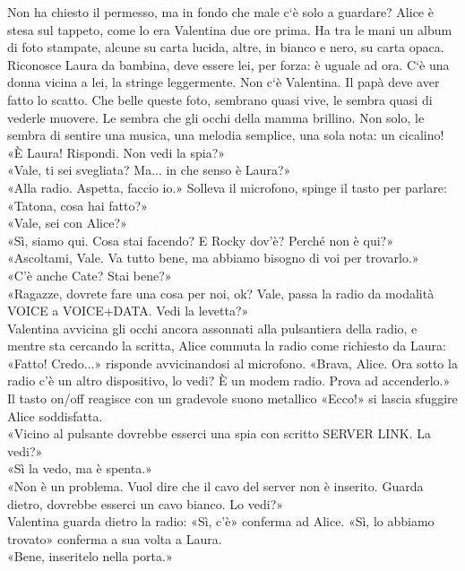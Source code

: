 \documentclass[10pt,oneside]{extbook}
\begin{document}
\par\medskip
Non ha chiesto il permesso, ma in fondo che male c`\`e solo a guardare? Alice \`e stesa sul tappeto, come lo era Valentina due ore prima. Ha tra le mani
un album di foto stampate, alcune su carta lucida, altre, in bianco e nero, su carta opaca. Riconosce Laura da bambina, deve essere lei, per forza: \`e uguale ad ora. C`\`e una donna vicina a lei, la stringe leggermente. Non c`\`e Valentina. Il papà deve aver fatto lo scatto. Che belle queste foto, sembrano quasi vive, le sembra quasi di vederle muovere. Le sembra che gli occhi della mamma brillino. Non solo, le sembra di sentire una  musica, una melodia semplice, una sola nota: un cicalino! \\
«\`E Laura! Rispondi. Non vedi la spia?»\\
«Vale, ti sei svegliata? Ma... in che senso \`e Laura?»\\
«Alla radio. Aspetta, faccio io.» Solleva il microfono, spinge il tasto per parlare: «Tatona, cosa hai fatto?»\\
«Vale, sei con Alice?»\\
«Sì, siamo qui. Cosa stai facendo? E Rocky dov’\`e? Perché non \`e qui?»\\
«Ascoltami, Vale. Va tutto bene, ma abbiamo bisogno di voi per trovarlo.»\\
«C’\`e anche Cate? Stai bene?»\\
«Ragazze, dovrete fare una cosa per noi, ok? Vale, passa la radio da modalità VOICE a VOICE+DATA. Vedi la levetta?»\\
Valentina avvicina gli occhi ancora assonnati alla pulsantiera della radio, e mentre sta cercando la scritta, Alice commuta la radio come richiesto da Laura: «Fatto! Credo...» risponde avvicinandosi al microfono. «Brava, Alice. Ora sotto la radio c'\`e un altro dispositivo, lo vedi? \`E un modem radio. Prova ad accenderlo.»\\
Il tasto on/off reagisce con un gradevole suono metallico «Ecco!» si lascia sfuggire Alice soddisfatta.\\
«Vicino al pulsante dovrebbe esserci una spia con scritto SERVER LINK. La vedi?»\\
«Sì la vedo, ma \`e spenta.»\\
«Non \`e un problema. Vuol dire che il cavo del server non \`e inserito. Guarda dietro, dovrebbe esserci un cavo bianco. Lo vedi?»\\
Valentina guarda dietro la radio: «Sì, c'\`e» conferma ad Alice. «Sì, lo abbiamo trovato»  conferma a sua volta a Laura.\\
«Bene, inseritelo nella porta.»\\
\end{document}
